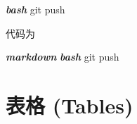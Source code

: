 \documentclass[]{ctexbook}
\newenvironment{Shaded}{\begin{snugshade}}{\end{snugshade}}
\newcommand{\FunctionTok}[1]{\textcolor[rgb]{0.00,0.00,0.00}{#1}}
\newcommand{\InformationTok}[1]{\textcolor[rgb]{0.56,0.35,0.01}{\textbf{\textit{#1}}}}
\newcommand{\NormalTok}[1]{#1}
\begin{document}
\begin{Shaded}
\begin{Highlighting}[]
\InformationTok{\textasciigrave{}\textasciigrave{}\textasciigrave{}bash}
\FunctionTok{git}\NormalTok{ push}
\InformationTok{\textasciigrave{}\textasciigrave{}\textasciigrave{}}
\end{Highlighting}
\end{Shaded}

代码为

\begin{Shaded}
\begin{Highlighting}[]
\InformationTok{\textasciigrave{}\textasciigrave{}\textasciigrave{}\textasciigrave{}markdown}
\InformationTok{\textasciigrave{}\textasciigrave{}\textasciigrave{}bash}
\FunctionTok{git}\NormalTok{ push}
\InformationTok{\textasciigrave{}\textasciigrave{}\textasciigrave{}}
\InformationTok{\textasciigrave{}\textasciigrave{}\textasciigrave{}\textasciigrave{}}
\end{Highlighting}
\end{Shaded}

\hypertarget{ux8868ux683c-tables}{%
\section{表格 (Tables)}\label{ux8868ux683c-tables}}
\end{document}

